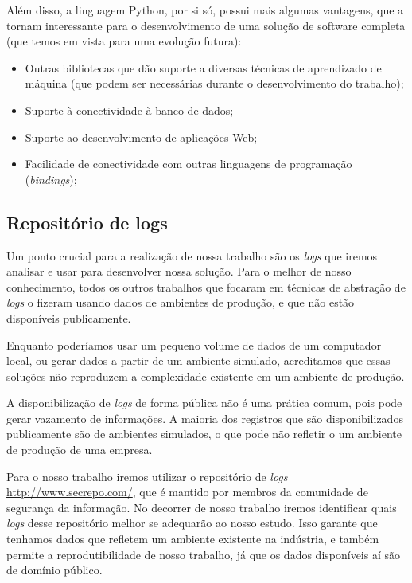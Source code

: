 \documentclass[
	12pt,				%
	openright,			%
	twoside,			%
	a4paper,			%
	english,			%
	spanish,			%
	brazil,				%
	]{abntex2}
\begin{document}
Além disso, a linguagem Python, por si só, possui mais algumas vantagens, que a tornam interessante para o desenvolvimento de uma solução de software completa (que temos em vista para uma evolução futura):

\begin{itemize}
	\item Outras bibliotecas que dão suporte a diversas técnicas de aprendizado de máquina (que podem ser necessárias durante o desenvolvimento do trabalho);
	\item Suporte à conectividade à banco de dados;
	\item Suporte ao desenvolvimento de aplicações Web;
	\item Facilidade de conectividade com outras linguagens de programação (\emph{bindings});
\end{itemize}

\subsection{Repositório de logs}

Um ponto crucial para a realização de nossa trabalho são os \emph{logs} que iremos analisar e usar para desenvolver nossa solução. Para o melhor de nosso conhecimento, todos os outros trabalhos que focaram em técnicas de abstração de \emph{logs} o fizeram usando dados de ambientes de produção, e que não estão disponíveis publicamente.

Enquanto poderíamos usar um pequeno volume de dados de um computador local, ou gerar dados a partir de um ambiente simulado, acreditamos que essas soluções não reproduzem a complexidade existente em um ambiente de produção.

A disponibilização de \emph{logs} de forma pública não é uma prática comum, pois pode gerar vazamento de informações. A maioria dos registros que são disponibilizados publicamente são de ambientes simulados, o que pode não refletir o um ambiente de produção de uma empresa.

Para o nosso trabalho iremos utilizar o repositório de \emph{logs} \url{http://www.secrepo.com/}, que é mantido por membros da comunidade de segurança da informação. No decorrer de nosso trabalho iremos identificar quais \emph{logs} desse repositório melhor se adequarão ao nosso estudo. Isso garante que tenhamos dados que refletem um ambiente existente na indústria, e também permite a reprodutibilidade de nosso trabalho, já que os dados disponíveis aí são de domínio público.
\end{document}
